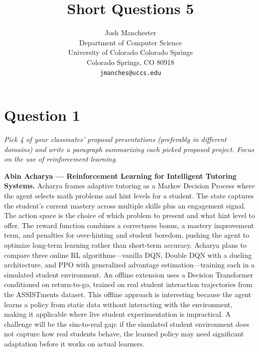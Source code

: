 \documentclass[letterpaper]{article}
\title{Short Questions 5}
\author{
    Josh Manchester\\
    Department of Computer Science\\
    University of Colorado Colorado Springs\\
    Colorado Springs, CO 80918\\
    \texttt{jmanches@uccs.edu}
}
\begin{document}
\maketitle

\section*{Question 1}
\textit{Pick 4 of your classmates' proposal presentations (preferably in different domains) and write a paragraph summarizing each picked proposed project. Focus on the use of reinforcement learning.}

\vspace{0.5em}

\textbf{Abin Acharya --- Reinforcement Learning for Intelligent Tutoring Systems.}
Acharya frames adaptive tutoring as a Markov Decision Process where the agent selects math problems and hint levels for a student. The state captures the student's current mastery across multiple skills plus an engagement signal. The action space is the choice of which problem to present and what hint level to offer. The reward function combines a correctness bonus, a mastery improvement term, and penalties for over-hinting and student boredom, pushing the agent to optimize long-term learning rather than short-term accuracy. Acharya plans to compare three online RL algorithms---vanilla DQN, Double DQN with a dueling architecture, and PPO with generalized advantage estimation---training each in a simulated student environment. An offline extension uses a Decision Transformer conditioned on return-to-go, trained on real student interaction trajectories from the ASSISTments dataset. This offline approach is interesting because the agent learns a policy from static data without interacting with the environment, making it applicable where live student experimentation is impractical. A challenge will be the sim-to-real gap: if the simulated student environment does not capture how real students behave, the learned policy may need significant adaptation before it works on actual learners.

\vspace{0.5em}
\end{document}
